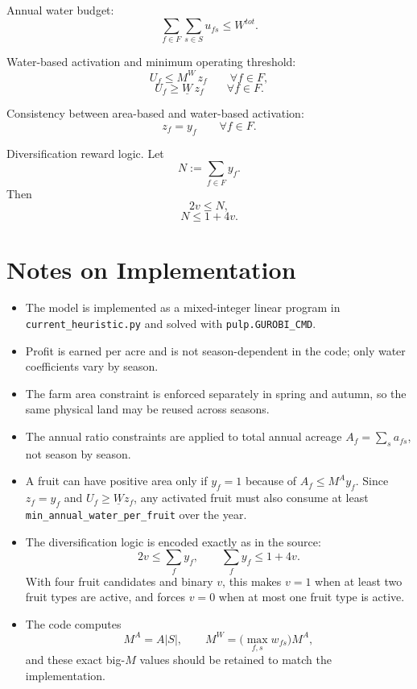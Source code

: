 Annual water budget:
\[
\sum_{f\in F}\sum_{s\in S} u_{fs} \le W^{tot}.
\]

Water-based activation and minimum operating threshold:
\[
U_f \le M^W\, z_f \qquad \forall f\in F,
\]
\[
U_f \ge \underline{W}\, z_f \qquad \forall f\in F.
\]

Consistency between area-based and water-based activation:
\[
z_f = y_f \qquad \forall f\in F.
\]

Diversification reward logic. Let
\[
N := \sum_{f\in F} y_f.
\]
Then
\[
2v \le N,
\]
\[
N \le 1 + 4v.
\]

\section*{Notes on Implementation}

\begin{itemize}
    \item The model is implemented as a mixed-integer linear program in \texttt{current\_heuristic.py} and solved with \texttt{pulp.GUROBI\_CMD}.
    \item Profit is earned per acre and is not season-dependent in the code; only water coefficients vary by season.
    \item The farm area constraint is enforced separately in spring and autumn, so the same physical land may be reused across seasons.
    \item The annual ratio constraints are applied to total annual acreage $A_f=\sum_s a_{fs}$, not season by season.
    \item A fruit can have positive area only if $y_f=1$ because of $A_f\le M^A y_f$. Since $z_f=y_f$ and $U_f\ge \underline{W} z_f$, any activated fruit must also consume at least \texttt{min\_annual\_water\_per\_fruit} over the year.
    \item The diversification logic is encoded exactly as in the source:
    \[
    2v \le \sum_f y_f,\qquad \sum_f y_f \le 1+4v.
    \]
    With four fruit candidates and binary $v$, this makes $v=1$ when at least two fruit types are active, and forces $v=0$ when at most one fruit type is active.
    \item The code computes
    \[
    M^A=A|S|,\qquad
    M^W=\Big(\max_{f,s} w_{fs}\Big)M^A,
    \]
    and these exact big-$M$ values should be retained to match the implementation.
\end{itemize}
